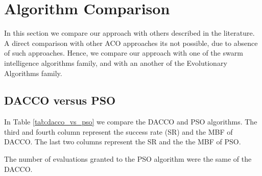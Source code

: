 	\section{Algorithm Comparison}
	In this section we compare our approach with others described in the literature. A direct comparison with other ACO approaches its not possible, due to absence of such approaches. Hence, we compare our approach with one of the swarm intelligence algorithms family, and with an another of the Evolutionary Algorithms family.
	
	\subsection{DACCO versus PSO}
	In Table \ref{tab:dacco_vs_pso} we compare the DACCO and PSO algorithms. The third and fourth column represent the success rate (SR) and the MBF of DACCO. The last two columns represent the SR and the the MBF of PSO. 
	
	The number of evaluations granted to the PSO algorithm were the same of the DACCO. 
	
